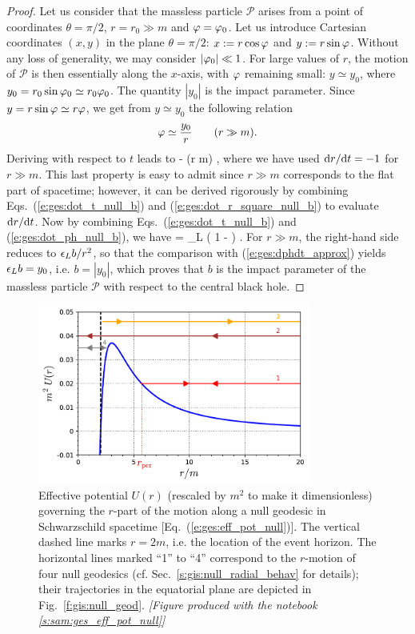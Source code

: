 \begin{proof}
Let us consider that the massless
particle $\mathscr{P}$ arises from a point of coordinates $\theta=\pi/2$,
$r=r_0 \gg m$ and $\varphi = \varphi_0$.  Let us introduce
Cartesian coordinates $(x,y)$ in the plane $\theta=\pi/2$:
$x:=r\cos\varphi$ and $y:=r\sin\varphi$.
Without any loss of generality, we may
consider $|\varphi_0| \ll 1$. For large values of $r$, the motion of
$\mathscr{P}$ is then essentially along the $x$-axis, with $\varphi$ remaining small:
$y\simeq y_0$, where
$y_0 = r_0 \sin\varphi_0 \simeq r_0 \varphi_0$. The quantity
$|y_0|$ is the impact parameter.
Since $y=r\sin\varphi\simeq r\varphi$, we get from $y\simeq y_0$
the following relation
\[
    \varphi \simeq \frac{y_0}{r} \qquad (r \gg m) .
\]
Deriving with respect to $t$ leads to
\be \label{e:ges:dphdt_approx}
     \simeq -  
                  \simeq {}  \qquad (r \gg m) ,
\ee
where we have used $\mathrm{d} r / \mathrm{d} t = - 1$ for $r \gg m$. This last property is easy
to admit since
$r\gg m$ corresponds to the flat part of spacetime; however, it can be derived
rigorously by combining Eqs.~(\ref{e:ges:dot_t_null_b}) and
(\ref{e:ges:dot_r_square_null_b}) to evaluate $\mathrm{d} r / \mathrm{d} t$.
Now by combining Eqs.~(\ref{e:ges:dot_t_null_b}) and (\ref{e:ges:dot_ph_null_b}),
we have
\be
     = \eps_L  \left( 1 -  \right) .
\ee
For $r\gg m$, the right-hand side reduces to $\epsilon_L b/r^2$, so that the comparison
with (\ref{e:ges:dphdt_approx}) yields $\epsilon_L b = y_0$, i.e. $b = |y_0|$,
which proves that $b$ is the impact
parameter of the massless particle $\mathscr{P}$ with respect to the central
black hole.
\end{proof}

\begin{figure}
\centerline{\includegraphics[width=0.8\textwidth]{ges_eff_pot_null.pdf}}
\caption[]{\label{f:gis:eff_pot_null} \footnotesize
Effective potential $U(r)$ (rescaled by $m^2$ to make it dimensionless)
governing the $r$-part of the
motion along a null geodesic in
Schwarzschild spacetime [Eq.~(\ref{e:ges:eff_pot_null})].
The vertical dashed line marks $r=2m$, i.e. the
location of the event horizon. The horizontal lines marked ``1'' to ``4''
correspond to the $r$-motion of four null geodesics (cf. Sec.~\ref{s:gis:null_radial_behav} for details); their trajectories in the equatorial plane
are depicted in Fig.~\ref{f:gis:null_geod}.
\textsl{[Figure produced with the notebook \ref{s:sam:ges_eff_pot_null}]}}
\end{figure}


